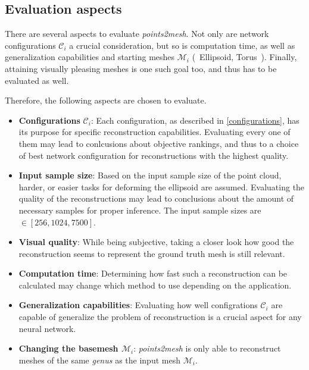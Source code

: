 \subsection{Evaluation aspects}
    There are several aspects to evaluate \emph{points2mesh}. Not only are network configurations $\mathcal{C}_i$ a crucial consideration,
    but so is computation time, as well as generalization capabilities and starting meshes $\mathcal{M}_i$ (~Ellipsoid, Torus~). 
    Finally,
    attaining visually pleasing meshes is one such goal too, and thus has to be evaluated as well.

    Therefore, the following aspects are chosen to evaluate.
    \begin{itemize}
        \item \textbf{Configurations} $\mathcal{C}_i$: Each configuration, as described in \ref{configurations}, has its purpose 
                for specific reconstruction capabilities. Evaluating every one of them may lead to conlcusions about objective rankings, and thus
                to a choice of best network configuration for reconstructions with the highest quality.
        \item \textbf{Input sample size}: Based on the input sample size of the point cloud, harder, or easier tasks for deforming the ellipsoid are assumed. 
                Evaluating the quality of the reconstructions may lead to conclusions about the amount of necessary samples for proper inference.
                The input sample sizes are $\in[256,1024,7500]$. 
        \item \textbf{Visual quality}: While being subjective, taking a closer look how good the reconstruction seems to represent the ground truth mesh
        is still relevant.
        \item \textbf{Computation time}: Determining how fast such a reconstruction can be calculated may change which method to use depending on the application.
        \item \textbf{Generalization capabilities}: Evaluating how well configrations $\mathcal{C}_i$ are capable of generalize the problem of reconstruction is a crucial aspect
        for any neural network. 
        \item \textbf{Changing the basemesh $\mathcal{M}_i$}: \emph{points2mesh} is only able to reconstruct meshes of the same \emph{genus} as the input mesh $\mathcal{M}_i$.

\end{itemize}
